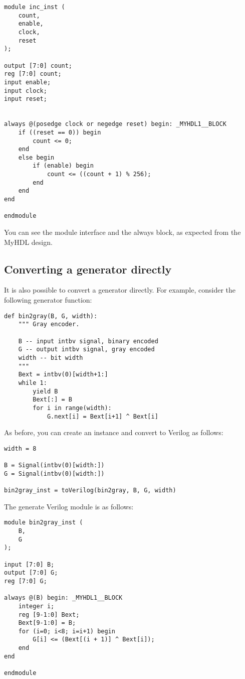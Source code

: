 \documentclass{howto}
\begin{document}
\begin{verbatim}
module inc_inst (
    count,
    enable,
    clock,
    reset
);

output [7:0] count;
reg [7:0] count;
input enable;
input clock;
input reset;


always @(posedge clock or negedge reset) begin: _MYHDL1__BLOCK
    if ((reset == 0)) begin
        count <= 0;
    end
    else begin
        if (enable) begin
            count <= ((count + 1) % 256);
        end
    end
end

endmodule
\end{verbatim}

You can see the module interface and the always block, as expected
from the MyHDL design. 

\subsection{Converting a generator directly}

It is also possible to convert a generator
directly. For example, consider the following generator function:

\begin{verbatim}
def bin2gray(B, G, width):
    """ Gray encoder.

    B -- input intbv signal, binary encoded
    G -- output intbv signal, gray encoded
    width -- bit width
    """
    Bext = intbv(0)[width+1:]
    while 1:
        yield B
        Bext[:] = B
        for i in range(width):
            G.next[i] = Bext[i+1] ^ Bext[i]
\end{verbatim}

As before, you can create an instance and convert to
Verilog as follows:

\begin{verbatim}
width = 8

B = Signal(intbv(0)[width:])
G = Signal(intbv(0)[width:])

bin2gray_inst = toVerilog(bin2gray, B, G, width)
 \end{verbatim}

The generate Verilog module is as follows:

\begin{verbatim}
module bin2gray_inst (
    B,
    G
);

input [7:0] B;
output [7:0] G;
reg [7:0] G;

always @(B) begin: _MYHDL1__BLOCK
    integer i;
    reg [9-1:0] Bext;
    Bext[9-1:0] = B;
    for (i=0; i<8; i=i+1) begin
        G[i] <= (Bext[(i + 1)] ^ Bext[i]);
    end
end

endmodule
\end{verbatim}
\end{document}
